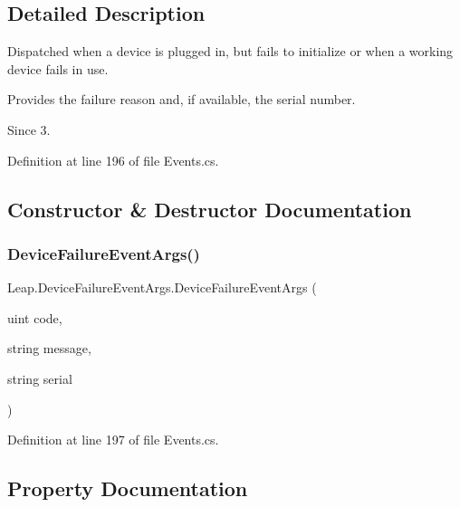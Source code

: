 \subsection{Detailed Description}
Dispatched when a device is plugged in, but fails to initialize or when a working device fails in use. 

Provides the failure reason and, if available, the serial number. \begin{DoxySince}{Since}
3. 
\end{DoxySince}


Definition at line 196 of file Events.\+cs.



\subsection{Constructor \& Destructor Documentation}
\mbox{\label{class_leap_1_1_device_failure_event_args_afd2dfa795d28777bdf9264d81e7bd9ec}} 
\subsubsection{\texorpdfstring{DeviceFailureEventArgs()}{DeviceFailureEventArgs()}}
{\footnotesize\ttfamily Leap.\+Device\+Failure\+Event\+Args.\+Device\+Failure\+Event\+Args (\begin{DoxyParamCaption}\item[{uint}]{code,  }\item[{string}]{message,  }\item[{string}]{serial }\end{DoxyParamCaption})}



Definition at line 197 of file Events.\+cs.



\subsection{Property Documentation}
\mbox{\label{class_leap_1_1_device_failure_event_args_a7fb44f91311e8344a9af9d33dd307d28}} 
